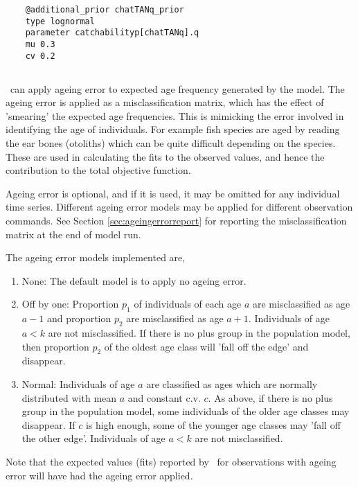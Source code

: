 {{{{{{\begin{verbatim}
	@additional_prior chatTANq_prior
	type lognormal
	parameter catchabilityp[chatTANq].q
	mu 0.3
	cv 0.2	
	\end{verbatim}}}


\subsection{}

\CNAME\ can apply ageing error to expected age frequency generated by the model. The ageing error is applied as a misclassification matrix, which has the effect of 'smearing' the expected age frequencies. This is mimicking the error involved in identifying the age of individuals. For example fish species are aged by reading the ear bones (otoliths) which can be quite difficult depending on the species. These are used in calculating the fits to the observed values, and hence the contribution to the total objective function. 

Ageing error is optional, and if it is used, it may be omitted for any individual time series. Different ageing error models may be applied for different observation commands. See Section \ref{sec:ageingerrorreport} for reporting the misclassification matrix at the end of model run.

The ageing error models implemented are,
\begin{enumerate}
  \item{None}: The default model is to apply no ageing error.
  \item{Off by one}: Proportion $p_1$ of individuals of each age $a$ are misclassified as age $a-1$ and proportion $p_2$ are misclassified as age $a+1$. Individuals of age $a < k$ are not misclassified. If there is no plus group in the population model, then proportion $p_2$ of the oldest age class will 'fall off the edge' and disappear. 
  \item{Normal}: Individuals of age $a$ are classified as ages which are normally distributed with mean $a$ and constant c.v. $c$. As above, if there is no plus group in the population model, some individuals of the older age classes may disappear. If $c$ is high enough, some of the younger age classes may 'fall off the other edge'. Individuals of age $a < k$ are not misclassified.
\end{enumerate}

Note that the expected values (fits) reported by \CNAME\ for observations with ageing error will have had the ageing error applied. 



}}}}
